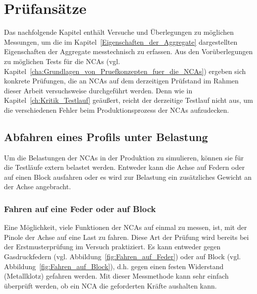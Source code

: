 \chapter{Prüfansätze}\label{cha:Pruefkonzepte}





Das nachfolgende Kapitel enthält Versuche und Überlegungen zu möglichen Messungen, um die im Kapitel~\ref{Eigenschaften_der_Aggregate} dargestellten Eigenschaften der Aggregate messtechnisch zu erfassen. Aus den Vorüberlegungen zu möglichen Tests für die NCAs (vgl. Kapitel~\ref{cha:Grundlagen_von_Pruefkonzepten_fuer_die_NCAs}) ergeben sich konkrete Prüfungen, die an NCAs auf dem derzeitigen Prüfstand im Rahmen dieser Arbeit versuchsweise durchgeführt werden. Denn wie in Kapitel~\ref{ch:Kritik_Testlauf} geäußert, reicht der derzeitige Testlauf nicht aus, um die verschiedenen Fehler beim Produktionsprozess der NCAs aufzudecken.



\section{Abfahren eines Profils unter Belastung}

Um die Belastungen der NCAs in der Produktion zu simulieren, können sie für die Testläufe extern belastet werden. Entweder kann die Achse auf Federn oder auf einen Block ausfahren oder es wird zur Belastung ein zusätzliches Gewicht an der Achse angebracht.



\subsection{Fahren auf eine Feder oder auf Block}\label{cha:Fahren auf eine Feder oder auf Block}


 
Eine Möglichkeit, viele Funktionen der NCAs auf einmal zu messen, ist, mit der Pinole der Achse auf eine Last zu fahren. Diese Art der Prüfung wird bereits bei der Erstmusterprüfung im Versuch praktiziert. Es kann entweder gegen Gasdruckfedern (vgl. Abbildung~\ref{fig:Fahren_auf_Feder}) oder auf Block (vgl. Abbildung~\ref{fig:Fahren_auf_Block}), d.h. gegen einen festen Widerstand (Metallklotz) gefahren werden. Mit dieser Messmethode kann sehr einfach überprüft werden, ob ein NCA die geforderten Kräfte aushalten kann.



